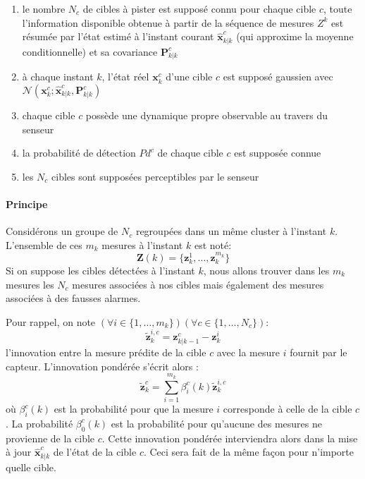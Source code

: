 \documentclass[10pt,french,a4paper]{report}
\begin{document}
\begin{enumerate}[label=\arabic*.]
\item le nombre $N_c$ de cibles à pister est supposé connu pour chaque cible $c$, toute l'information disponible obtenue à partir de la séquence de mesures $Z^k$ est résumée par l'état estimé à l'instant courant $\hat{\mathbf{x}}_{k|k}^c$ (qui approxime la moyenne conditionnelle) et sa covariance $\mathbf{P}_{k|k}^c$ 
\item à chaque instant $k$, l'état réel $\mathbf{x}^c_k$ d'une cible $c$ est supposé gaussien avec $\mathcal{N}(\mathbf{x}^c_k; \hat{\mathbf{x}}_{k|k}^c, \mathbf{P}_{k|k}^c)$
\item chaque cible $c$ possède une dynamique propre observable au travers du senseur
\item la probabilité de détection $Pd^c$ de chaque cible $c$ est supposée connue
\item les $N_c$  cibles sont supposées perceptibles par le senseur
\end{enumerate}
									\paragraph{Principe}
									
						Considérons un groupe de $N_c$ regroupées dans un même cluster à l'instant $k$. L'ensemble de ces $m_k$  mesures à l'instant $k$ est noté: 
	 \begin{equation}
\mathbf{Z}(k)=\{\mathbf{z}^1_k, \ldots, \mathbf{z}^{m_k}_k\}	 
	 \end{equation}
 				Si on suppose les cibles détectées à l'instant $k$, nous allons trouver dans les $m_k$ mesures les $N_c$  mesures associées à nos cibles mais également des mesures associées à des fausses alarmes. 
 				
 				Pour rappel, on note $(\forall i \in \{1,\ldots,m_k\})(\forall c \in \{1,\ldots,N_c\})$:
 		 \begin{equation}
\tilde{\mathbf{z}}^{i,c}_k= \mathbf{z}^c_{k|k-1} - \mathbf{z}^i_{k}
	 \end{equation}			
 				l'innovation entre la mesure prédite de la cible $c$ avec la mesure $i$ fournit par le capteur. 
 				L'innovation pondérée s'écrit alors : 
 		 		 \begin{equation}
\tilde{\mathbf{z}}^{c}_k= \sum_{i=1}^{m_k}\beta_i^c(k) \tilde{\mathbf{z}}^{i,c}_k
	 \end{equation}		
 	où $\beta_i^c(k)$ est la probabilité pour que la mesure $i$ corresponde à celle de la cible $c$. La probabilité $\beta_0^c(k)$ est la probabilité pour qu'aucune des mesures ne provienne de la cible $c$. Cette innovation pondérée interviendra alors dans
la mise à jour $\hat{\mathbf{x}}_{k|k}^c$ de l'état de la cible $c$. Ceci sera fait de la même façon pour n'importe quelle cible.			
				
\end{document}
